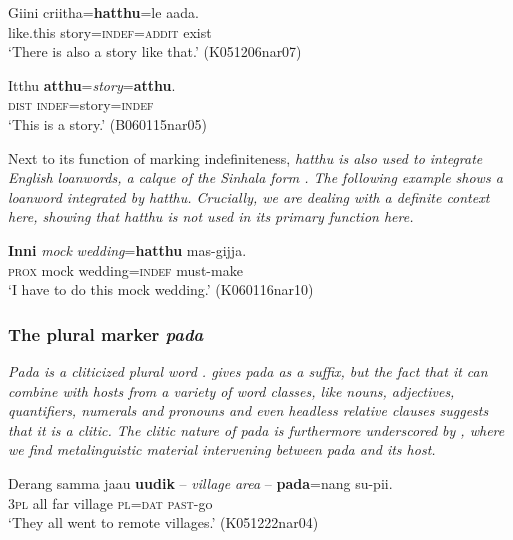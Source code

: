 \ea \label{ex:hatthu:enclitic}
\gll Giini criitha=\textbf{hatthu}=le aada. \\
     like.this story=\textsc{indef}=\textsc{addit} exist  \\
    `There is also a story like that.'  (K051206nar07)
\z




\ea \label{ex:hatthu:preenclitic1}
\gll Itthu \textbf{atthu}={\em story}=\textbf{atthu}. \\
       \textsc{dist} \textsc{indef}=story=\textsc{indef}\\
    `This is a story.'  (B060115nar05)
\z



Next to its function of marking indefiniteness, \em hatthu \em is also used to integrate English loanwords, a calque of the Sinhala form  \citep{NitzEtAl2010}. The following example shows a loanword integrated by \em hatthu\em. Crucially, we are dealing with a \em definite \em context here, showing that \em hatthu \em is not used in its primary function here.

\ea  
\gll \textbf{Inni}     {\em mock}       {\em wedding}=\textbf{hatthu}  mas-gijja. \\
      \textsc{prox} mock wedding=\textsc{indef}  must-make \\
    `I have to do this mock wedding.'  (K060116nar10)
\z

\subsubsection{The plural marker \em pada\em}
\em Pada \em is a cliticized plural word \citep{Dryer1989plural}. \citet[14]{Ansaldo2005ms} gives \em pada \em as a suffix, but the fact that it can combine with hosts from a variety of word classes, like  nouns, adjectives, quantifiers, numerals and pronouns and even headless relative clauses suggests that it is a clitic. The clitic nature of \em pada \em is furthermore underscored by , where we find metalinguistic material intervening between \em pada \em and its host.
 
\ea \label{ex:pada:metaling}
\gll Derang samma jaau \textbf{uudik} -- {\em village} {\em area} --  \textbf{pada}=nang   su-pii. \\
      3\textsc{pl} all far village {} {} {} {} \textsc{pl}=\textsc{dat} \textsc{past}-go \\
    `They all went to remote villages.' (K051222nar04)
\z 

